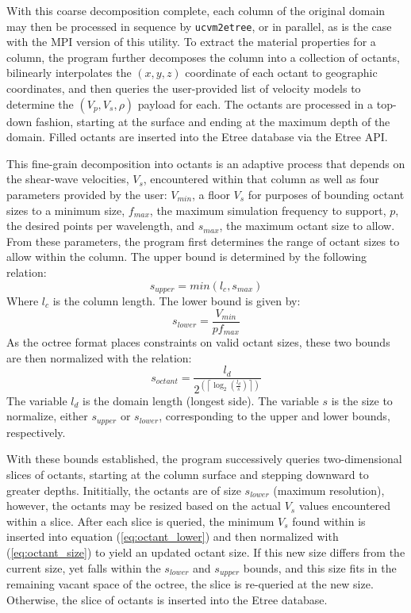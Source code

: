 With this coarse decomposition complete, each column of the original domain may then be processed in sequence by \texttt{ucvm2etree}, or in parallel, as is the case with the MPI version of this utility. To extract the material properties for a column, the program further decomposes the column into a collection of octants, bilinearly interpolates the $(x,y,z)$ coordinate of each octant to geographic coordinates, and then queries the user-provided list of velocity models to determine the $(V_p, V_s, \rho)$ payload for each. The octants are processed in a top-down fashion, starting at the surface and ending at the maximum depth of the domain. Filled octants are inserted into the Etree database via the Etree API.

This fine-grain decomposition into octants is an adaptive process that depends on the shear-wave velocities, $V_s$, encountered within that column as well as four parameters provided by the user: $V_{min}$, a floor $V_s$ for purposes of bounding octant sizes to a minimum size, $f_{max}$, the maximum simulation frequency to support, $p$, the desired points per wavelength, and $s_{max}$, the maximum octant size to allow. From these parameters, the program first determines the range of octant sizes to allow within the column. The upper bound is determined by the following relation:
\begin{equation}\label{eq:octant_upper}
s_{upper} = min(l_c, s_{max})
\end{equation}
Where $l_c$ is the column length. The lower bound is given by:
\begin{equation}\label{eq:octant_lower}
s_{lower} = \frac{V_{min}}{p f_{max}}
\end{equation}
As the octree format places constraints on valid octant sizes, these two bounds are then normalized with the relation:
\begin{equation}\label{eq:octant_size}
s_{octant} = \frac{l_{d}}{ 2^{\left( \left\lceil \log_{2}(\frac{l_{d}}{s}) \right\rceil \right)} }
\end{equation}
The variable $l_{d}$ is the domain length (longest side). The variable $s$ is the size to normalize, either $s_{upper}$ or $s_{lower}$, corresponding to the upper and lower bounds, respectively.

With these bounds established, the program successively queries two-dimensional slices of octants, starting at the column surface and stepping downward to greater depths. Inititially, the octants are of size $s_{lower}$ (maximum resolution), however, the octants may be resized based on the actual $V_s$ values encountered within a slice. After each slice is queried, the minimum $V_s$ found within is inserted into equation (\ref{eq:octant_lower}) and then normalized with (\ref{eq:octant_size}) to yield an updated octant size. If this new size differs from the current size, yet falls within the $s_{lower}$ and $s_{upper}$ bounds, and this size fits in the remaining vacant space of the octree, the slice is re-queried at the new size. Otherwise, the slice of octants is inserted into the Etree database.

